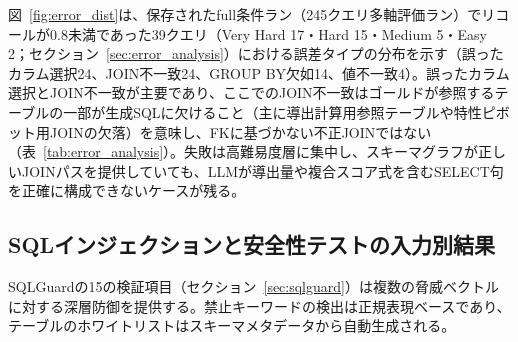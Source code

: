 \documentclass[twocolumn]{interact}
\makeatletter
\def\toprule{\noalign{\ifnum0=`}\fi
  \@aboverulesep=\abovetopsep
  \global\@belowrulesep=\belowrulesep
  \global\@thisruleclass=\@ne
  \@ifnextchar[{\@BTrule}{\@BTrule[\heavyrulewidth]}}
\def\midrule{\noalign{\ifnum0=`}\fi
  \@aboverulesep=\aboverulesep
  \global\@belowrulesep=\belowrulesep
  \global\@thisruleclass=\@ne
  \@ifnextchar[{\@BTrule}{\@BTrule[\lightrulewidth]}}
\def\bottomrule{\noalign{\ifnum0=`}\fi
  \@aboverulesep=\aboverulesep
  \global\@belowrulesep=\belowbottomsep
  \global\@thisruleclass=\@ne
  \@ifnextchar[{\@BTrule}{\@BTrule[\heavyrulewidth]}}
\makeatother
\begin{document}
図~\ref{fig:error_dist}は、保存されたfull条件ラン（245クエリ多軸評価ラン）でリコールが0.8未満であった39クエリ（Very Hard 17・Hard 15・Medium 5・Easy 2；セクション~\ref{sec:error_analysis}）における誤差タイプの分布を示す（誤ったカラム選択24、JOIN不一致24、GROUP BY欠如14、値不一致4）。誤ったカラム選択とJOIN不一致が主要であり、ここでのJOIN不一致はゴールドが参照するテーブルの一部が生成SQLに欠けること（主に導出計算用参照テーブルや特性ピボット用JOINの欠落）を意味し、FKに基づかない不正JOINではない（表~\ref{tab:error_analysis}）。失敗は高難易度層に集中し、スキーマグラフが正しいJOINパスを提供していても、LLMが導出量や複合スコア式を含むSELECT句を正確に構成できないケースが残る。


\subsection{SQLインジェクションと安全性テストの入力別結果}

SQLGuardの15の検証項目（セクション~\ref{sec:sqlguard}）は複数の脅威ベクトルに対する深層防御を提供する。禁止キーワードの検出は正規表現ベースであり、テーブルのホワイトリストはスキーマメタデータから自動生成される。

\begin{table}[htbp]
  \centering
  \caption{SQLインジェクションと安全性テスト結果（すべて安全に処理された）。}
  \label{tab:injection_results}
  \footnotesize
\end{table}
\end{document}
